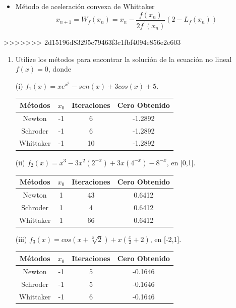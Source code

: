\documentclass{udparticle}
\begin{document}
\begin{enumerate}
\begin{itemize}
        \item Método de aceleración convexa de Whittaker
            \begin{equation*}
                x_{n+1}=W_f(x_n)=x_n - \frac{f(x_n)}{2f^{'}(x_n)}(2 - L_f(x_n))
            \end{equation*}
        
\end{itemize}
>>>>>>> 2d15196d83295c79463f3c1fbf4094e856e2e603
	\begin{enumerate}
	
		\item Utilize los métodos para encontrar la solución de la ecuación no lineal $f(x)=0$, donde
		
		(i) $f_{1}(x)=xe^{x^2}-sen(x)+3cos(x)+5$.
		
		\begin{table}[H]
			\centering
			\begin{tabular}{|c|c|c|c|}
				\hline
				Métodos & $x_{0}$ & Iteraciones & Cero Obtenido \\
				\hline
				Newton & -1 & 6 & -1.2892 \\
				\hline
				Schroder & -1 & 6 & -1.2892 \\
				\hline
				Whittaker & -1 & 10 & -1.2892 \\
				\hline				
			\end{tabular}
			\end{table}	
		
		
		
		(ii) $f_{2}(x)=x^3-3x^2(2^{-x})+3x(4^{-x})-8^{-x}$, en [0,1].
		
			\begin{table}[H]
			\centering
			\begin{tabular}{|c|c|c|c|}
				\hline
				Métodos & $x_{0}$ & Iteraciones & Cero Obtenido \\
				\hline
				Newton & 1 & 43 & 0.6412 \\
				\hline
				Schroder & 1 & 4 & 0.6412\\
				\hline
				Whittaker & 1 & 66 & 0.6412\\
				\hline				
			\end{tabular}
			\end{table}	
			
		(iii) $f_{3}(x)=cos(x+\sqrt[2]{2})+x(\frac{x}{2}+2)$, en [-2,1].	
		
		\begin{table}[H]
			\centering
			\begin{tabular}{|c|c|c|c|}
				\hline
				Métodos & $x_{0}$ & Iteraciones & Cero Obtenido \\
				\hline
				Newton & -1 & 5 & -0.1646 \\
				\hline
				Schroder & -1 & 5 & -0.1646\\
				\hline
				Whittaker & -1 & 6 & -0.1646 \\
				\hline				
			\end{tabular}
		\end{table}		
			

\end{enumerate}
\end{enumerate}
\end{document}
